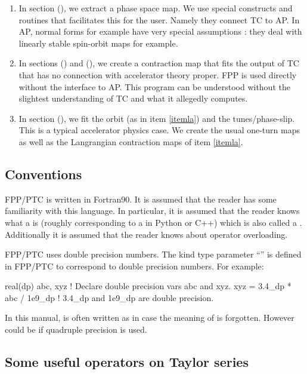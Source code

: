 \documentclass{hitec}     %
\begin{document}
{{{ \begin{enumerate}
 \item In section (), we extract a phase space map.  We use special constructs  and routines  that facilitates this for the user. Namely they connect TC to AP. In AP, normal forms for example have very special assumptions : they deal with linearly stable spin-orbit maps for example.
 \item\label{itemla} In sections () and (), we create a contraction map that fits the output of TC  that has no connection with accelerator theory proper. FPP is used directly without the interface to AP. This program can be understood without the slightest understanding of TC and what it allegedly computes.
 \item In  section (), we fit the orbit (as in item \ref{itemla}) and the tunes/phase-slip. This is a typical accelerator physics case. We create the usual one-turn maps as well as the Langrangian contraction maps of item \ref{itemla}.
 \end{enumerate}
\subsection{Conventions}
\label{s:conventions}

FPP/PTC is written in Fortran90. It is assumed that the reader has some familiarity with this
language. In particular, it is assumed that the reader knows what a  is (roughly
corresponding to a  in Python or C++) which is also called a . Additionally it is
assumed that the reader knows about operator overloading.

FPP/PTC uses double precision numbers. The kind type parameter ``'' is defined in FPP/PTC to
correspond to double precision numbers.    For example:
\begin{code}
real(dp) abc, xyz             ! Declare double precision vars abc and xyz.
xyz = 3.4_dp * abc / 1e9_dp   ! 3.4_dp and 1e9_dp are double precision.
\end{code}

In this manual,  is often written as  in case the meaning of  is forgotten. However  could be  if quadruple precision is used.

\subsection{Some useful operators on Taylor series}\label{s:useful}

}}}
\end{document}
